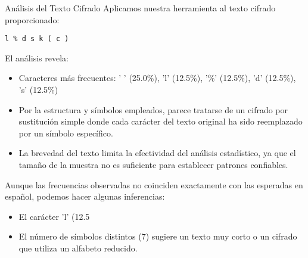 \begin{cryptoanalysis}{Análisis del Texto Cifrado}
	Aplicamos nuestra herramienta al texto cifrado proporcionado:
	\begin{verbatim}
l % d s k ( c )
\end{verbatim}

	El análisis revela:
	\begin{itemize}
		\item Caracteres más frecuentes:
		      ' ' (25.0\%), 'l' (12.5\%), '\%' (12.5\%), 'd' (12.5\%), 's' (12.5\%)

		\item Por la estructura y símbolos empleados, parece tratarse de un cifrado por sustitución simple donde cada carácter del texto original ha sido reemplazado por un símbolo específico.

		\item La brevedad del texto limita la efectividad del análisis estadístico, ya que el tamaño de la muestra no es suficiente para establecer patrones confiables.
	\end{itemize}

	Aunque las frecuencias observadas no coinciden exactamente con las esperadas en español, podemos hacer algunas inferencias:
	\begin{itemize}
		\item El carácter 'l' (12.5%

		\item El número de símbolos distintos (7) sugiere un texto muy corto o un cifrado que utiliza un alfabeto reducido.
	\end{itemize}
\end{cryptoanalysis}